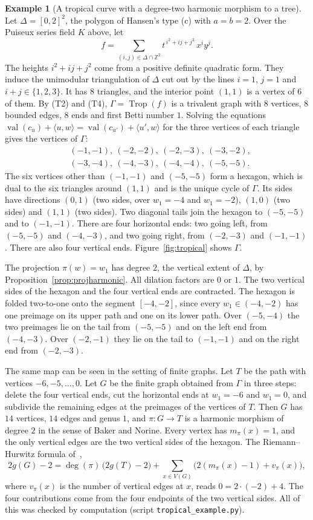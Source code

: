 \documentclass[12pt,letterpaper]{article}
\numberwithin{equation}{section}
\theoremstyle{definition}
\newtheorem{example}[theorem]{Example}
\theoremstyle{remark}
\newcommand{\Z}{\mathbb{Z}}
\begin{document}
\begin{example}[A tropical curve with a degree-two harmonic morphism to a
tree]\label{ex:tropical}
Let $\Delta=[0,2]^2$, the polygon of Hansen's type (c) with $a=b=2$. Over the
Puiseux series field $K$ above, let
\[
f=\sum_{(i,j)\in\Delta\cap\Z^2}t^{\,i^2+ij+j^2}\,x^iy^j .
\]
The heights $i^2+ij+j^2$ come from a positive definite quadratic form. They
induce the unimodular triangulation of $\Delta$ cut out by the lines $i=1$,
$j=1$ and $i+j\in\{1,2,3\}$. It has $8$ triangles, and the interior point
$(1,1)$ is a vertex of $6$ of them. By (T2) and (T4), $\Gamma=\operatorname{Trop}(f)$
is a trivalent graph with $8$ vertices, $8$ bounded edges, $8$ ends and first
Betti number $1$. Solving the equations
$\operatorname{val}(c_u)+\langle u,w\rangle=\operatorname{val}(c_{u'})+\langle
u',w\rangle$ for the three vertices of each triangle gives the vertices of
$\Gamma$:
\[
\begin{aligned}
&(-1,-1),\ (-2,-2),\ (-2,-3),\ (-3,-2),\\
&(-3,-4),\ (-4,-3),\ (-4,-4),\ (-5,-5).
\end{aligned}
\]
The six vertices other than $(-1,-1)$ and $(-5,-5)$ form a hexagon, which is
dual to the six triangles around $(1,1)$ and is the unique cycle of $\Gamma$.
Its sides have directions $(0,1)$ (two sides, over $w_1=-4$ and $w_1=-2$),
$(1,0)$ (two sides) and $(1,1)$ (two sides). Two diagonal tails join the
hexagon to $(-5,-5)$ and to $(-1,-1)$. There are four horizontal ends: two going
left, from $(-5,-5)$ and $(-4,-3)$, and two going right, from $(-2,-3)$ and
$(-1,-1)$. There are also four vertical ends. Figure~\ref{fig:tropical} shows
$\Gamma$.

The projection $\pi(w)=w_1$ has degree $2$, the vertical extent of $\Delta$, by
Proposition~\ref{prop:projharmonic}. All dilation factors are $0$ or $1$. The
two vertical sides of the hexagon and the four vertical ends are contracted.
The hexagon is folded two-to-one onto the segment $[-4,-2]$, since every
$w_1\in(-4,-2)$ has one preimage on its upper path and one on its lower path.
Over $(-5,-4)$ the two preimages lie on the tail from $(-5,-5)$ and on the left
end from $(-4,-3)$. Over $(-2,-1)$ they lie on the tail to $(-1,-1)$ and on the
right end from $(-2,-3)$.

The same map can be seen in the setting of finite graphs. Let $T$ be the path
with vertices $-6,-5,\dots,0$. Let $G$ be the finite graph obtained from
$\Gamma$ in three steps: delete the four vertical ends, cut the horizontal ends
at $w_1=-6$ and $w_1=0$, and subdivide the remaining edges at the preimages of
the vertices of $T$. Then $G$ has $14$ vertices, $14$ edges and genus $1$, and
$\pi:G\to T$ is a harmonic morphism of degree $2$ in the sense of Baker and
Norine. Every vertex has $m_\pi(x)=1$, and the only vertical edges are the two
vertical sides of the hexagon. The Riemann--Hurwitz formula
of~\cite{BN09},
\[
2g(G)-2=\deg(\pi)\,\bigl(2g(T)-2\bigr)+\sum_{x\in V(G)}\bigl(2(m_\pi(x)-1)+v_\pi(x)\bigr),
\]
where $v_\pi(x)$ is the number of vertical edges at $x$, reads $0=2\cdot(-2)+4$.
The four contributions come from the four endpoints of the two vertical
sides. All of this was checked by computation (script
\texttt{tropical\_example.py}).


\end{example}
\end{document}
